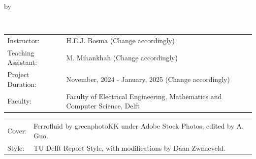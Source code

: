 \begin{titlepage}

\begin{center}

{\makeatletter
\largetitlestyle\fontsize{45}{45}\selectfont\@title
\makeatother}

{\makeatletter
\ifdefvoid{\@subtitle}{}{\bigskip\titlestyle\fontsize{20}{20}\selectfont\@subtitle}
\makeatother}

\bigskip
\bigskip

by

\bigskip
\bigskip

{\makeatletter
\largetitlestyle\fontsize{25}{25}\selectfont\@author\\
\makeatother}

\bigskip
\bigskip

\setlength\extrarowheight{2pt}

\vfill

\begin{tabular}{ll}
    Instructor: & H.E.J. Bosma (Change accordingly) \\
    Teaching Assistant: & M. Mihankhah (Change accordingly)\\
    Project Duration: & November, 2024 - January, 2025 (Change accordingly) \\
    Faculty: & Faculty of Electrical Engineering, Mathematics and Computer Science, Delft
\end{tabular}

\bigskip
\bigskip

\begin{tabular}{p{15mm}p{10cm}}
    Cover: & Ferrofluid by greenphotoKK under Adobe Stock Photos, edited by A. Guo.\\
    Style: & TU Delft Report Style, with modifications by Daan Zwaneveld.
\end{tabular}

\end{center}


\end{titlepage}
